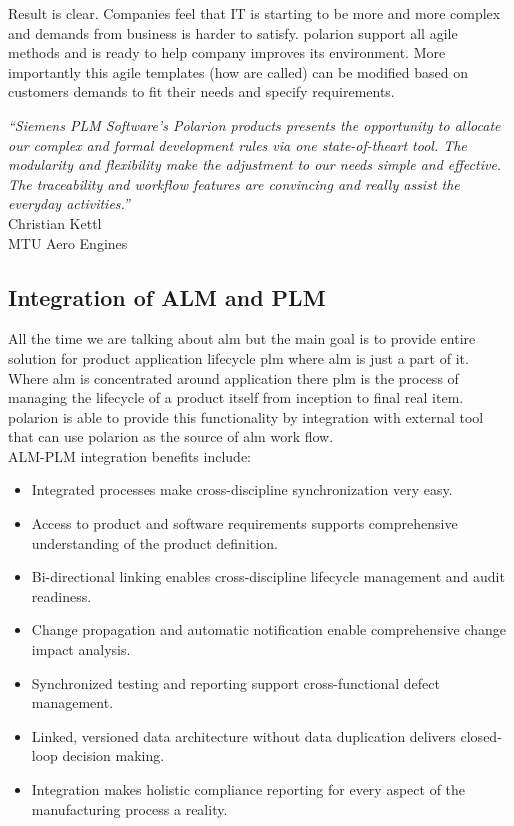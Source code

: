 \documentclass[thesis=M,english]{FITthesis}[2012/06/26]
\begin{document}
Result is clear. Companies feel that IT is starting to be more and more complex and demands from business is harder to satisfy. \acrshort{polarion} support all agile methods and is ready to help company improves its environment. More importantly this agile templates (how are called) can be modified based on customers demands to fit their needs and specify requirements.

\begin{center}
	\textit{“Siemens PLM Software’s Polarion
		products presents the opportunity to
		allocate our complex and formal
		development rules via one state-of-theart
		tool. The modularity and flexibility
		make the adjustment to our needs simple
		and effective. The traceability and
		workflow features are convincing and
		really assist the everyday activities.”}\\
Christian Kettl\\
MTU Aero Engines\\
\end{center}

\subsection{Integration of ALM and PLM}

All the time we are talking about \acrshort{alm} but the main goal is to provide entire solution for product application lifecycle \acrshort{plm} where \acrshort{alm} is just a part of it. Where \acrshort{alm} is concentrated around application there \acrshort{plm} is the process of managing the lifecycle of a product itself from inception to final real item. \acrshort{polarion} is able to provide this functionality by integration with external tool that can use \acrshort{polarion} as the source of \acrshort{alm} work flow.\\

ALM-PLM integration benefits include:

\begin{itemize}[nosep]
	\item Integrated processes make cross-discipline synchronization
	very easy.
	\item Access to product and software requirements supports
	comprehensive understanding of the product definition.
	\item Bi-directional linking enables cross-discipline lifecycle
	management and audit readiness.
	\item Change propagation and automatic notification enable
	comprehensive change impact analysis.
	\item Synchronized testing and reporting support cross-functional
	defect management.
	\item Linked, versioned data architecture without data duplication
	delivers closed-loop decision making.
	\item Integration makes holistic compliance reporting for every
	aspect of the manufacturing process a reality.
\end{itemize}
\end{document}
